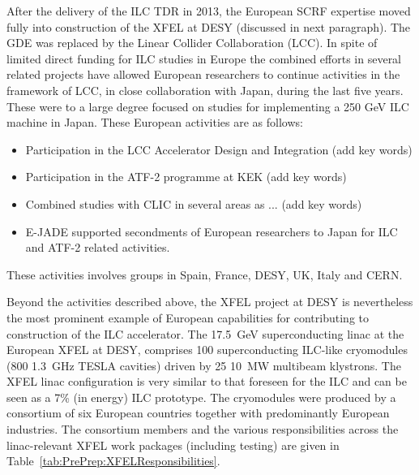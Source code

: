 \documentclass[%
 reprint,
 amsmath,amssymb,
 aps,
]{revtex4-1}
\begin{document}
After the delivery of the ILC TDR in 2013, the European SCRF expertise moved fully into construction of the XFEL at DESY (discussed in next paragraph). The GDE was replaced by the Linear Collider Collaboration (LCC). In spite of limited direct funding for ILC studies in Europe the combined efforts in several related projects have allowed European researchers to continue activities in the framework of LCC, in close collaboration with Japan, during the last five years. These were to a large degree focused on studies for implementing a 250 GeV ILC machine in Japan. 
These European activities are as follows:
\begin{itemize}
\item Participation in the LCC Accelerator Design and Integration (add key words)
\item Participation in the ATF-2 programme at KEK (add key words)
\item Combined studies with CLIC in several areas as ... (add key words)
\item E-JADE supported secondments of European researchers to Japan for ILC and ATF-2 related activities.
\end{itemize}
These activities involves groups in Spain, France, DESY, UK, Italy and CERN. 



\vspace{0.15cm}
Beyond the activities described above, the XFEL project at DESY is nevertheless the most prominent example of European capabilities for contributing to construction of the ILC accelerator.
The 17.5~GeV superconducting linac at the European XFEL at DESY, comprises 100 superconducting ILC-like cryomodules (800 1.3~GHz TESLA cavities) driven by 25 10~MW multibeam klystrons. The XFEL linac configuration is very similar to that foreseen for the ILC and can be seen as a 7\% (in energy) ILC prototype. The cryomodules were produced by a consortium of six European countries together with predominantly European industries. The consortium members and the various responsibilities across the linac-relevant XFEL work packages (including testing) are given in Table~\ref{tab:PrePrep:XFELResponsibilities}.
\end{document}
